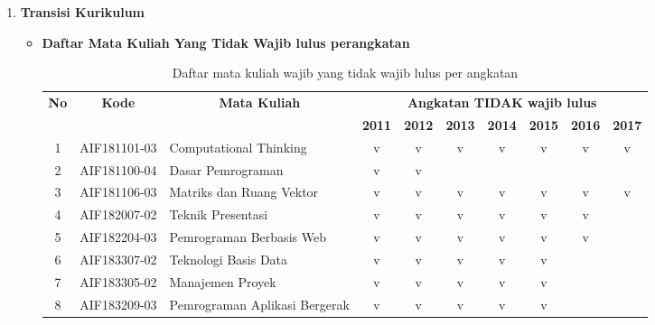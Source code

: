 \documentclass[a4paper,twoside]{article}
\begin{document}
\begin{enumerate}
\begin{enumerate}
			\item \textbf{Transisi Kurikulum} \\
				\begin{itemize}
					\item \textbf{Daftar Mata Kuliah Yang Tidak Wajib lulus perangkatan} \\
					\begin{table}[H]
					\centering
					\caption{Daftar mata kuliah wajib yang tidak wajib lulus per angkatan}
					\label{tab:2_wajibtidaklulus}
					\begin{tabular}{|c|c|p{3.25cm}|c|c|c|c|c|c|c|}
					\hline
					\multicolumn{1}{|c|}{\multirow{2}{*}{\textbf{No}}} & \multicolumn{1}{c|}{\multirow{2}{*}{\textbf{Kode}}} & \multicolumn{1}{c|}{\multirow{2}{*}{\textbf{Mata Kuliah}}} & \multicolumn{7}{c|}{\textbf{Angkatan TIDAK wajib lulus}} \\ \cline{4-10} 
					\multicolumn{1}{|c|}{} & \multicolumn{1}{c|}{} & \multicolumn{1}{c|}{} & \textbf{2011} & \textbf{2012} & \textbf{2013} & \textbf{2014} & \textbf{2015} & \textbf{2016} & \textbf{2017} \\ \hline
					1 & AIF181101-03 & Computational Thinking & v & v & v & v & v & v & v \\ \hline
					2 & AIF181100-04 & Dasar Pemrograman & v & v &  &  &  &  &  \\ \hline
					3 & AIF181106-03 & Matriks dan Ruang Vektor & v & v & v & v & v & v & v \\ \hline
					4 & AIF182007-02 & Teknik Presentasi & v & v & v & v & v & v &  \\ \hline
					5 & AIF182204-03 & Pemrograman Berbasis Web & v & v & v & v & v & v &  \\ \hline
					6 & AIF183307-02 & Teknologi Basis Data & v & v & v & v & v &  &  \\ \hline
					7 & AIF183305-02 & Manajemen Proyek & v & v & v & v & v &  &  \\ \hline
					8 & AIF183209-03 & Pemrograman Aplikasi Bergerak & v & v & v & v & v &  &  \\ \hline
					\end{tabular}
					\end{table}
					

\end{itemize}
\end{enumerate}
\end{enumerate}
\end{document}

